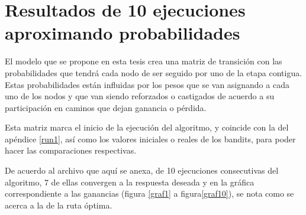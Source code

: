 \chapter{Resultados de 10 ejecuciones aproximando probabilidades}
\label{resultProb10}

El modelo que se propone en esta tesis crea una matriz de transición con las probabilidades que tendrá cada nodo de ser seguido por uno de la etapa contigua. Estas probabilidades están influidas por los pesos que se van asignando a cada uno de los nodos y que van siendo reforzados o castigados de acuerdo a su participación en caminos que dejan ganancia o pérdida.

Esta matriz marca el inicio de la ejecución del algoritmo, y coincide con la del apéndice \ref{run1}, así como los valores iniciales o reales de los bandits, para poder hacer las comparaciones respectivas.

De acuerdo al archivo que aquí se anexa, de 10 ejecuciones consecutivas del algoritmo, 7 de ellas convergen a la respuesta deseada y en la gráfica correspondiente a las ganancias (figura \ref{graf1} a figura\ref{graf10}), se nota como se acerca a la de la ruta óptima.

